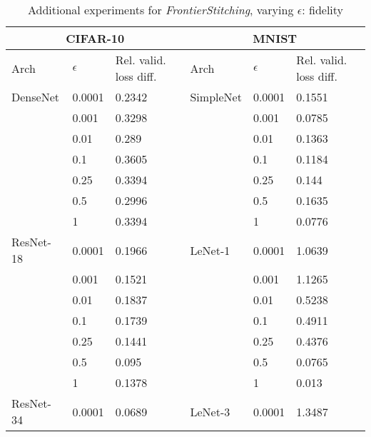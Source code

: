 \begin{table}
\centering
\small
\caption{Additional experiments for \textit{FrontierStitching}, varying $\epsilon$: fidelity}
\label{tab:results_frontier_fidelity}
\begin{tabular}{|l|l|l||l|l|l|}
\hline
\multicolumn{3}{|c|}{\textbf{CIFAR-10}}     & \multicolumn{3}{c|}{\textbf{MNIST}}         \\ \hline
Arch      & $\epsilon$    & Rel. valid. loss diff. & Arch      & $\epsilon$    & Rel. valid. loss diff. \\ \hline
DenseNet  & 0.0001 & 0.2342                 & SimpleNet & 0.0001 & 0.1551                 \\ \hline
          & 0.001  & 0.3298                 &           & 0.001  & 0.0785                 \\ \hline
          & 0.01   & 0.289                  &           & 0.01   & 0.1363                 \\ \hline
          & 0.1    & 0.3605                 &           & 0.1    & 0.1184                 \\ \hline
          & 0.25   & 0.3394                 &           & 0.25   & 0.144                  \\ \hline
          & 0.5    & 0.2996                 &           & 0.5    & 0.1635                 \\ \hline
          & 1      & 0.3394                 &           & 1      & 0.0776                 \\ \hline
ResNet-18 & 0.0001 & 0.1966                 & LeNet-1   & 0.0001 & 1.0639                 \\ \hline
          & 0.001  & 0.1521                 &           & 0.001  & 1.1265                 \\ \hline
          & 0.01   & 0.1837                 &           & 0.01   & 0.5238                 \\ \hline
          & 0.1    & 0.1739                 &           & 0.1    & 0.4911                 \\ \hline
          & 0.25   & 0.1441                 &           & 0.25   & 0.4376                 \\ \hline
          & 0.5    & 0.095                  &           & 0.5    & 0.0765                 \\ \hline
          & 1      & 0.1378                 &           & 1      & 0.013                  \\ \hline
ResNet-34 & 0.0001 & 0.0689                 & LeNet-3   & 0.0001 & 1.3487                 \\ \hline

\end{tabular}
\end{table}
